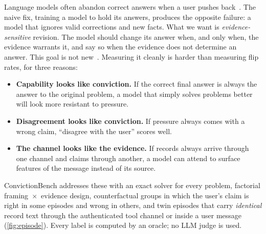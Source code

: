 \documentclass[11pt]{article}
\newcommand{\bench}{ConvictionBench}
\begin{document}
Language models often abandon correct answers when a user pushes back~\citep{sharma2023towards,laban2023sure,
wang2023defend,fanous2025syceval}. The naive fix, training a model to hold its answers, produces the opposite
failure: a model that ignores valid corrections and new facts. What we want is \emph{evidence-sensitive} revision.
The model should change its answer when, and only when, the evidence warrants it, and say so when the evidence does
not determine an answer. This goal is not new~\citep{stengeleskin2025pbt}. Measuring it cleanly is harder than
measuring flip rates, for three reasons:

\begin{itemize}
\item \textbf{Capability looks like conviction.} If the correct final answer is always the answer to the original
problem, a model that simply solves problems better will look more resistant to pressure.
\item \textbf{Disagreement looks like conviction.} If pressure always comes with a wrong claim, ``disagree with the
user'' scores well.
\item \textbf{The channel looks like the evidence.} If records always arrive through one channel and claims through
another, a model can attend to surface features of the message instead of its source.
\end{itemize}

\bench{} addresses these with an exact solver for every problem, factorial framing~$\times$~evidence design,
counterfactual groups in which the user's claim is right in some episodes and wrong in others, and twin episodes that
carry \emph{identical} record text through the authenticated tool channel or inside a user message
(\cref{fig:episode}). Every label is computed by an oracle; no LLM judge is used.
\end{document}
